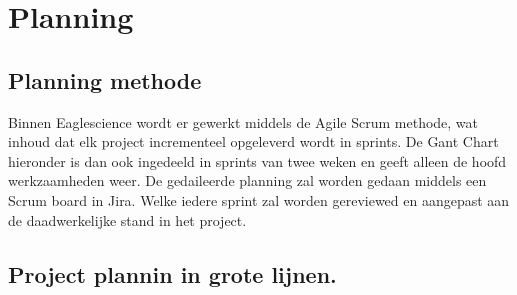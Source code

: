 
\chapter{Planning}\label{ch:planning} %

\label{planning} %

\section{Planning methode}\label{sec:planning-methode}
Binnen Eaglescience wordt er gewerkt middels de Agile Scrum methode, wat inhoud dat elk project incrementeel opgeleverd wordt in sprints.
De Gant Chart hieronder is dan ook ingedeeld in sprints van twee weken en geeft alleen de hoofd werkzaamheden weer.
De gedaileerde planning zal worden gedaan middels een Scrum board in Jira.
Welke iedere sprint zal worden gereviewed en aangepast aan de daadwerkelijke stand in het project.

\section{Project plannin in grote lijnen.}\label{sec:project-plannin-in-grote-lijnen.}
